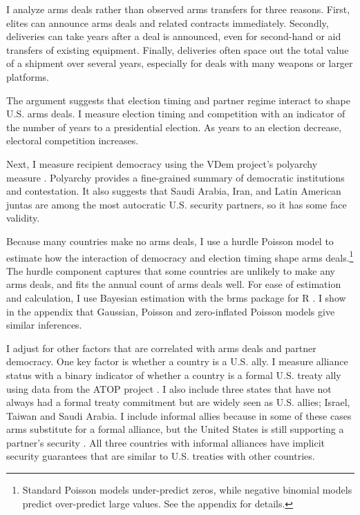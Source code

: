 \documentclass[12pt]{article}
\begin{document}
I analyze arms deals rather than observed arms transfers for three reasons.
First, elites can announce arms deals and related contracts immediately. 
Secondly, deliveries can take years after a deal is announced, even for second-hand or aid transfers of existing equipment. 
Finally, deliveries often space out the total value of a shipment over several years, especially for deals with many weapons or larger platforms. 


The argument suggests that election timing and partner regime interact to shape U.S. arms deals. 
I measure election timing and competition with an indicator of the number of years to a presidential election. 
As years to an election decrease, electoral competition increases. 


Next, I measure recipient democracy using the VDem project's polyarchy measure \citep{Coppedgeetal2008}. 
Polyarchy provides a fine-grained summary of democratic institutions and contestation.
It also suggests that Saudi Arabia, Iran, and Latin American juntas are among the most autocratic U.S. security partners, so it has some face validity.  


Because many countries make no arms deals, I use a hurdle Poisson model to estimate how the interaction of democracy and election timing shape arms deals.\footnote{Standard Poisson models under-predict zeros, while negative binomial models predict over-predict large values. See the appendix for details.} 
The hurdle component captures that some countries are unlikely to make any arms deals, and fits the annual count of arms deals well.
For ease of estimation and calculation, I use Bayesian estimation with the brms package for \textsf{R} \citep{Buerkner2017}. 
I show in the appendix that Gaussian, Poisson and zero-inflated Poisson models give similar inferences. 


I adjust for other factors that are correlated with arms deals and partner democracy. 
One key factor is whether a country is a U.S. ally. 
I measure alliance status with a binary indicator of whether a country is a formal U.S. treaty ally using data from the ATOP project \citep{Leedsetal2002}.
I also include three states that have not always had a formal treaty commitment but are widely seen as U.S. allies; Israel, Taiwan and Saudi Arabia. 
I include informal allies because in some of these cases arms substitute for a formal alliance, but the United States is still supporting a partner's security \citep{Yarhi-Miloetal2016}. 
All three countries with informal alliances have implicit security guarantees that are similar to U.S. treaties with other countries. 
\end{document}
